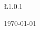 \begin{center}	
\begin{bfseries}
\bigskip
\bigskip

 \L{1.0.1} 

\bigskip
\bigskip

\today

\end{bfseries}
\end{center}
